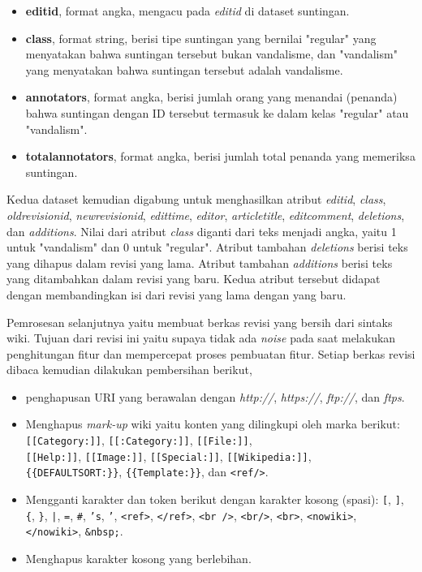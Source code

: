 \begin{itemize}
	\item \textbf{editid}, format angka, mengacu pada \textit{editid} di
	dataset suntingan.
	\item \textbf{class}, format string, berisi tipe suntingan yang
	bernilai "regular" yang menyatakan bahwa suntingan tersebut bukan
	vandalisme, dan "vandalism" yang menyatakan bahwa suntingan tersebut
	adalah vandalisme.
	\item \textbf{annotators}, format angka, berisi jumlah orang yang
	menandai (penanda) bahwa suntingan dengan ID tersebut termasuk ke dalam
	kelas "regular" atau "vandalism".
	\item \textbf{totalannotators}, format angka, berisi jumlah total penanda yang memeriksa suntingan.
\end{itemize}

Kedua dataset kemudian digabung untuk menghasilkan atribut \textit{editid},
\textit{class}, \textit{oldrevisionid}, \textit{newrevisionid},
\textit{edittime}, \textit{editor}, \textit{articletitle},
\textit{editcomment}, \textit{deletions}, dan \textit{additions}.
Nilai dari atribut \textit{class} diganti dari teks menjadi angka, yaitu 1
untuk "vandalism" dan 0 untuk "regular".
Atribut tambahan \textit{deletions} berisi teks yang dihapus dalam revisi yang
lama.
Atribut tambahan \textit{additions} berisi teks yang ditambahkan dalam revisi
yang baru.
Kedua atribut tersebut didapat dengan membandingkan isi dari revisi yang lama
dengan yang baru.

Pemrosesan selanjutnya yaitu membuat berkas revisi yang bersih dari sintaks
wiki.
Tujuan dari revisi ini yaitu supaya tidak ada \textit{noise} pada saat
melakukan penghitungan fitur dan mempercepat proses pembuatan fitur.
Setiap berkas revisi dibaca kemudian dilakukan pembersihan berikut,

\begin{itemize}
\item penghapusan URI yang berawalan dengan
\textit{http://}, \textit{https://}, \textit{ftp://}, dan \textit{ftps}.
\item Menghapus \textit{mark-up} wiki yaitu konten yang dilingkupi oleh marka
berikut:
\texttt{[[Category:]]}, \texttt{[[:Category:]]}, \texttt{[[File:]]}, \\
\texttt{[[Help:]]}, \texttt{[[Image:]]}, \texttt{[[Special:]]},
\texttt{[[Wikipedia:]]}, \\
\texttt{\{\{DEFAULTSORT:\}\}}, \texttt{\{\{Template:\}\}}, dan \texttt{<ref/>}.

\newpage
\item Mengganti karakter dan token berikut dengan karakter kosong (spasi):
\texttt{[}, \texttt{]}, \texttt{\{}, \texttt{\}}, \texttt{|}, \texttt{=},
\texttt{\#}, \texttt{'s}, \texttt{'}, \texttt{<ref>}, \texttt{</ref>},
\texttt{<br />}, \texttt{<br/>}, \texttt{<br>}, \texttt{<nowiki>},
\texttt{</nowiki>}, \texttt{\&nbsp;}.
\item Menghapus karakter kosong yang berlebihan.
\end{itemize}
